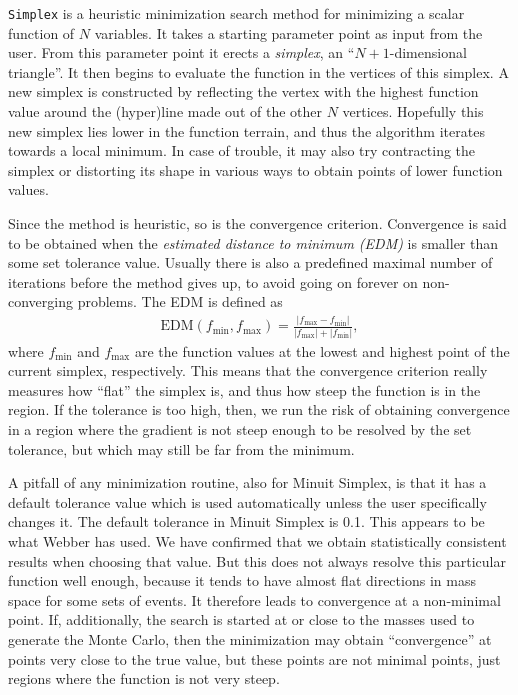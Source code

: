 \documentclass[twoside,english]{uiofysmaster}
\begin{document}
{\tt Simplex} \cite{nelder1965simplex} is a heuristic minimization search method for minimizing a scalar function of $N$ variables. It takes a starting parameter point as input from the user. From this parameter point it erects a {\it simplex}, an ``$N+1$-dimensional triangle''. It then begins to evaluate the function in the vertices of this simplex. A new simplex is constructed by reflecting the vertex with the highest function value around the (hyper)line made out of the other $N$ vertices. Hopefully this new simplex lies lower in the function terrain, and thus the algorithm iterates towards a local minimum. In case of trouble, it may also try contracting the simplex or distorting its shape in various ways to obtain points of lower function values. 

Since the method is heuristic, so is the convergence criterion. Convergence is said to be obtained when the {\it estimated distance to minimum (EDM)} is smaller than some set tolerance value. Usually there is also a predefined maximal number of iterations before the method gives up, to avoid going on forever on non-converging problems. The EDM is defined as
\begin{align}
	\mathrm{EDM}(f_\mathrm{min},f_\mathrm{max}) = \frac{|f_\mathrm{max}-f_\mathrm{min}|}{|f_\mathrm{max}| + |f_\mathrm{min}|},
\end{align}
where $f_\mathrm{min}$ and $f_\mathrm{max}$ are the function values at the lowest and highest point of the current simplex, respectively. This means that the convergence criterion really measures how ``flat'' the simplex is, and thus how steep the function is in the region. If the tolerance is too high, then, we run the risk of obtaining convergence in a region where the gradient is not steep enough to be resolved by the set tolerance, but which may still be far from the minimum.

A pitfall of any minimization routine, also for Minuit Simplex, is that it has a default tolerance value which is used automatically unless the user specifically changes it. The default tolerance in Minuit Simplex is 0.1. This appears to be what Webber has used. We have confirmed that we obtain statistically consistent results when choosing that value. But this does not always resolve this particular function well enough, because it tends to have almost flat directions in mass space for some sets of events. It therefore leads to convergence at a non-minimal point. If, additionally, the search is started at or close to the masses used to generate the Monte Carlo, then the minimization may obtain ``convergence'' at points very close to the true value, but these points are not minimal points, just regions where the function is not very steep.
\end{document}

